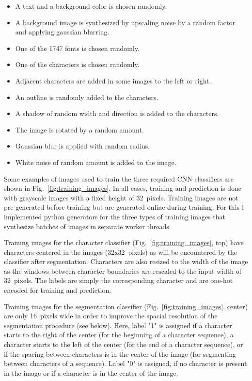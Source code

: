 \documentclass[11pt]{article}
\newcommand\figref[1]{Fig.~\ref{fig:#1}}
\begin{document}
\begin{itemize}
  \itemsep0em
  \item A text and a background color is chosen randomly.
  \item A background image is synthesized by upscaling noise by a random factor and applying gaussian blurring.
  \item One of the 1747 fonts is chosen randomly.
  \item One of the characters is chosen randomly.
  \item Adjacent characters are added in some images to the left or right.
  \item An outline is randomly added to the characters.
  \item A shadow of random width and direction is added to the characters.
  \item The image is rotated by a random amount.
  \item Gaussian blur is applied with random radius.
  \item White noise of random amount is added to the image.
\end{itemize}



Some examples of images used to train the three required CNN classifiers are shown in \figref{training_images}.
%
In all cases, training and prediction is done with grayscale images with a fixed height of 32~pixels.
%
Training images are not pre-generated before training but are generated online during training.
%
For this I implemented python generators for the three types of training images that synthesize
batches of images in separate worker threads.
%


Training images for the character classifier (\figref{training_images}, top) have characters centered in the images (32x32~pixels) as will be encountered
by the classifier after segmentation.
%
Characters are also resized to the width of the image as the windows between character boundaries are rescaled to the
input width of 32~pixels.
%
The labels are simply the corresponding character and are one-hot encoded for training and prediction.


Training images for the segmentation classifier (\figref{training_images}, center) are only 16~pixels wide in order to improve the spacial resolution of the segmentation procedure (see below).
%
Here, label "1" is assigned if a character starts to the right of the center (for the beginning of a character sequence),
a character starts to the left of the center (for the end of a character sequence), or if the spacing
between characters is in the center of the image (for segmenting between characters of a sequence).
%
Label "0" is assigned, if no character is present in the image or if a character is in the center of the image.
\end{document}
